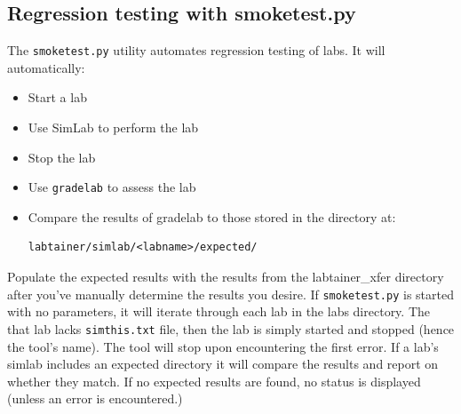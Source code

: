 \documentclass[12pt]{article}
\begin{document}
\subsection{Regression testing with smoketest.py} 
\label{smoketest}
The {\tt smoketest.py} utility automates regression testing of labs.  It will automatically:
\begin{itemize}
\item Start a lab
\item Use SimLab to perform the lab
\item Stop the lab
\item Use {\tt gradelab} to assess the lab
\item Compare the results of gradelab to those stored in the directory at:
\begin{verbatim}
labtainer/simlab/<labname>/expected/
\end{verbatim}
\end{itemize}
\noindent Populate the expected results with the results from the labtainer\_xfer directory after you've
manually determine the results you desire.
If {\tt smoketest.py} is started with no parameters, it will iterate through each lab in the labs
directory.  The that lab lacks {\tt simthis.txt} file, then the lab is simply started and stopped
(hence the tool's name).  The tool will stop upon encountering the first error.
If a lab's simlab includes an expected directory it will compare the results and report on whether they match.
If no expected results are found, no status is displayed (unless an error is encountered.)
\end{document}
